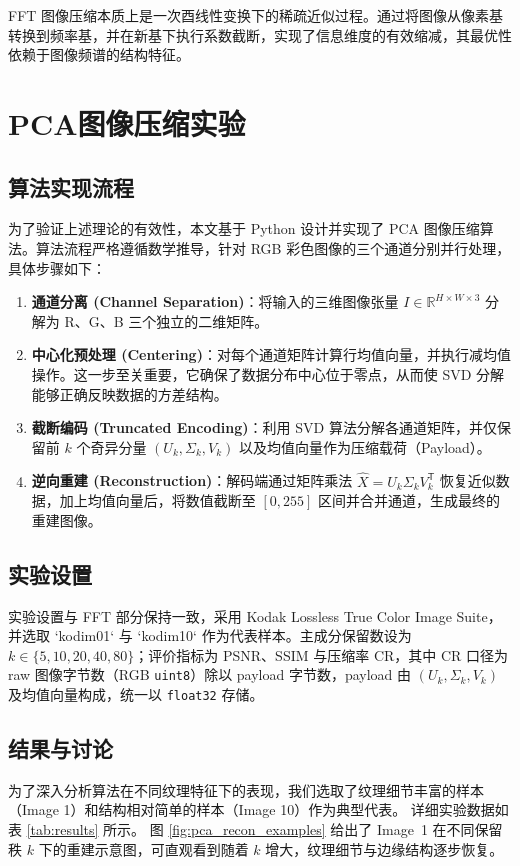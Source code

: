 \documentclass[12pt,a4paper]{article}
\begin{document}
FFT 图像压缩本质上是一次酉线性变换下的稀疏近似过程。通过将图像从像素基转换到频率基，并在新基下执行系数截断，实现了信息维度的有效缩减，其最优性依赖于图像频谱的结构特征。




\section{PCA图像压缩实验}
\subsection{算法实现流程}
为了验证上述理论的有效性，本文基于 Python 设计并实现了 PCA 图像压缩算法。算法流程严格遵循数学推导，针对 RGB 彩色图像的三个通道分别并行处理，具体步骤如下：
\begin{enumerate}
    \item \textbf{通道分离 (Channel Separation)}：将输入的三维图像张量 $I \in \mathbb{R}^{H \times W \times 3}$ 分解为 R、G、B 三个独立的二维矩阵。
    \item \textbf{中心化预处理 (Centering)}：对每个通道矩阵计算行均值向量，并执行减均值操作。这一步至关重要，它确保了数据分布中心位于零点，从而使 SVD 分解能够正确反映数据的方差结构。
    \item \textbf{截断编码 (Truncated Encoding)}：利用 SVD 算法分解各通道矩阵，并仅保留前 $k$ 个奇异分量 $(U_k, \Sigma_k, V_k)$ 以及均值向量作为压缩载荷（Payload）。
    \item \textbf{逆向重建 (Reconstruction)}：解码端通过矩阵乘法 $\hat{X} = U_k \Sigma_k V_k^\mathsf{T}$ 恢复近似数据，加上均值向量后，将数值截断至 $[0, 255]$ 区间并合并通道，生成最终的重建图像。
\end{enumerate}

\subsection{实验设置}
实验设置与 FFT 部分保持一致，采用 Kodak Lossless True Color Image Suite，并选取 `kodim01` 与 `kodim10` 作为代表样本。主成分保留数设为 $k \in \{5, 10, 20, 40, 80\}$；评价指标为 PSNR、SSIM 与压缩率 CR，其中 CR 口径为 raw 图像字节数（RGB \texttt{uint8}）除以 payload 字节数，payload 由 $(U_k,\Sigma_k,V_k)$ 及均值向量构成，统一以 \texttt{float32} 存储。

\subsection{结果与讨论}
为了深入分析算法在不同纹理特征下的表现，我们选取了纹理细节丰富的样本（Image 1）和结构相对简单的样本（Image 10）作为典型代表。
详细实验数据如表 \ref{tab:results} 所示。
图 \ref{fig:pca_recon_examples} 给出了 Image~1 在不同保留秩 $k$ 下的重建示意图，可直观看到随着 $k$ 增大，纹理细节与边缘结构逐步恢复。
\end{document}

